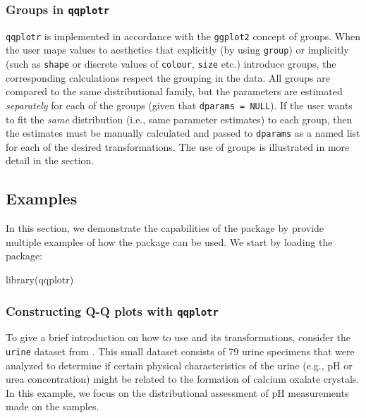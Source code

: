 \subsubsection{\texorpdfstring{Groups in
\texttt{qqplotr}}{Groups in qqplotr}}\label{groups-in-qqplotr}

\texttt{qqplotr} is implemented in accordance with the \texttt{ggplot2}
concept of groups. When the user maps values to aesthetics that
explicitly (by using \texttt{group}) or implicitly (such as
\texttt{shape} or discrete values of \texttt{colour}, \texttt{size}
etc.) introduce groups, the corresponding calculations respect the
grouping in the data. All groups are compared to the same distributional
family, but the parameters are estimated \emph{separately} for each of
the groups (given that \texttt{dparams\ =\ NULL}). If the user wants to
fit the \emph{same} distribution (i.e., same parameter estimates) to
each group, then the estimates must be manually calculated and passed to
\texttt{dparams} as a named list for each of the desired 
transformations. The use of groups is illustrated in more detail in the
 section.

\FloatBarrier

\subsection{Examples}\label{examples}

\label{sec:examples}

In this section, we demonstrate the capabilities of the 
package by provide multiple examples of how the package can be used. We
start by loading the package:

\begin{Schunk}
\begin{Sinput}
library(qqplotr)
\end{Sinput}
\end{Schunk}

\subsubsection{\texorpdfstring{Constructing Q-Q plots with
\texttt{qqplotr}}{Constructing Q-Q plots with qqplotr}}\label{constructing-q-q-plots-with-qqplotr}

To give a brief introduction on how to use  and its
transformations, consider the \texttt{urine} dataset from .
This small dataset consists of 79 urine specimens that were analyzed to
determine if certain physical characteristics of the urine (e.g., pH or
urea concentration) might be related to the formation of calcium oxalate
crystals. In this example, we focus on the distributional assessment of
pH measurements made on the samples.

